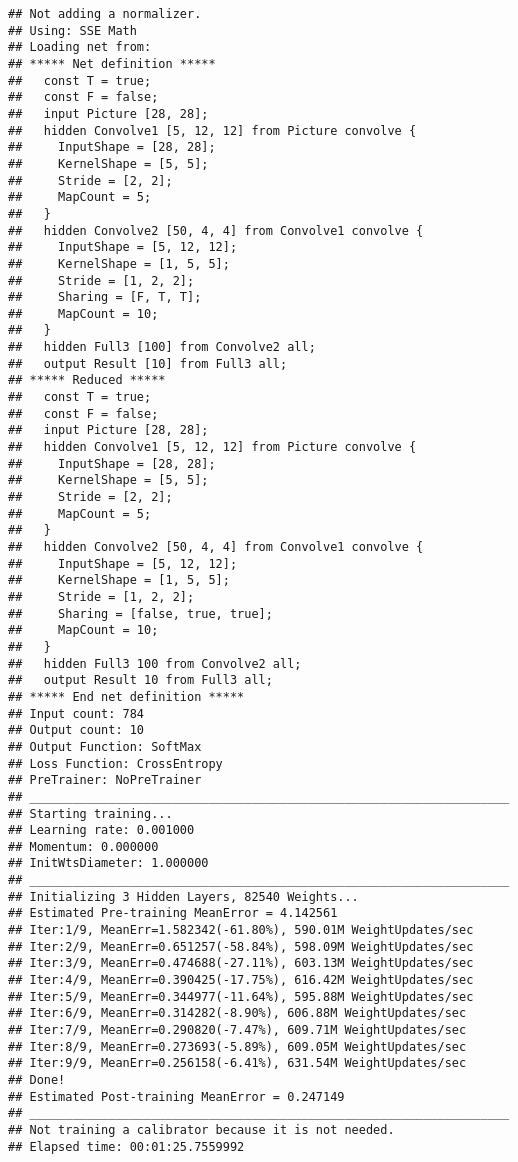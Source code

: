 \documentclass[]{book}
\theoremstyle{definition}
\theoremstyle{definition}
\theoremstyle{definition}
\theoremstyle{remark}
\begin{document}
\begin{verbatim}
## Not adding a normalizer.
## Using: SSE Math
## Loading net from: 
## ***** Net definition *****
##   const T = true;
##   const F = false;
##   input Picture [28, 28];
##   hidden Convolve1 [5, 12, 12] from Picture convolve {
##     InputShape = [28, 28];
##     KernelShape = [5, 5];
##     Stride = [2, 2];
##     MapCount = 5;
##   }
##   hidden Convolve2 [50, 4, 4] from Convolve1 convolve {
##     InputShape = [5, 12, 12];
##     KernelShape = [1, 5, 5];
##     Stride = [1, 2, 2];
##     Sharing = [F, T, T];
##     MapCount = 10;
##   }
##   hidden Full3 [100] from Convolve2 all;
##   output Result [10] from Full3 all;
## ***** Reduced *****
##   const T = true;
##   const F = false;
##   input Picture [28, 28];
##   hidden Convolve1 [5, 12, 12] from Picture convolve {
##     InputShape = [28, 28];
##     KernelShape = [5, 5];
##     Stride = [2, 2];
##     MapCount = 5;
##   }
##   hidden Convolve2 [50, 4, 4] from Convolve1 convolve {
##     InputShape = [5, 12, 12];
##     KernelShape = [1, 5, 5];
##     Stride = [1, 2, 2];
##     Sharing = [false, true, true];
##     MapCount = 10;
##   }
##   hidden Full3 100 from Convolve2 all;
##   output Result 10 from Full3 all;
## ***** End net definition *****
## Input count: 784
## Output count: 10
## Output Function: SoftMax
## Loss Function: CrossEntropy
## PreTrainer: NoPreTrainer
## ___________________________________________________________________
## Starting training...
## Learning rate: 0.001000
## Momentum: 0.000000
## InitWtsDiameter: 1.000000
## ___________________________________________________________________
## Initializing 3 Hidden Layers, 82540 Weights...
## Estimated Pre-training MeanError = 4.142561
## Iter:1/9, MeanErr=1.582342(-61.80%), 590.01M WeightUpdates/sec
## Iter:2/9, MeanErr=0.651257(-58.84%), 598.09M WeightUpdates/sec
## Iter:3/9, MeanErr=0.474688(-27.11%), 603.13M WeightUpdates/sec
## Iter:4/9, MeanErr=0.390425(-17.75%), 616.42M WeightUpdates/sec
## Iter:5/9, MeanErr=0.344977(-11.64%), 595.88M WeightUpdates/sec
## Iter:6/9, MeanErr=0.314282(-8.90%), 606.88M WeightUpdates/sec
## Iter:7/9, MeanErr=0.290820(-7.47%), 609.71M WeightUpdates/sec
## Iter:8/9, MeanErr=0.273693(-5.89%), 609.05M WeightUpdates/sec
## Iter:9/9, MeanErr=0.256158(-6.41%), 631.54M WeightUpdates/sec
## Done!
## Estimated Post-training MeanError = 0.247149
## ___________________________________________________________________
## Not training a calibrator because it is not needed.
## Elapsed time: 00:01:25.7559992
\end{verbatim}
\end{document}
